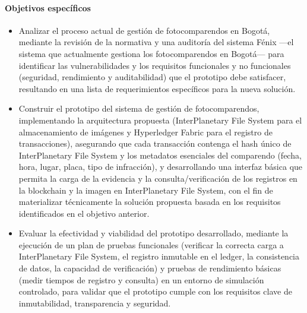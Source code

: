 \paragraph{Objetivos específicos}
\begin{itemize}
    \item Analizar el proceso actual de gestión de fotocomparendos en Bogotá, mediante la revisión de la normativa y una auditoría del sistema Fénix —el sistema que actualmente gestiona los fotocomparendos en Bogotá— para identificar las vulnerabilidades y los requisitos funcionales y no funcionales (seguridad, rendimiento y auditabilidad) que el prototipo debe satisfacer, resultando en una lista de requerimientos específicos para la nueva solución.
    \item Construir el prototipo del sistema de gestión de fotocomparendos, implementando la arquitectura propuesta (InterPlanetary File System para el almacenamiento de imágenes y Hyperledger Fabric para el registro de transacciones), asegurando que cada transacción contenga el hash único de InterPlanetary File System y los metadatos esenciales del comparendo (fecha, hora, lugar, placa, tipo de infracción), y desarrollando una interfaz básica que permita la carga de la evidencia y la consulta/verificación de los registros en la blockchain y la imagen en InterPlanetary File System, con el fin de materializar técnicamente la solución propuesta basada en los requisitos identificados en el objetivo anterior.
    \item Evaluar la efectividad y viabilidad del prototipo desarrollado, mediante la ejecución de un plan de pruebas funcionales (verificar la correcta carga a InterPlanetary File System, el registro inmutable en el ledger, la consistencia de datos, la capacidad de verificación) y pruebas de rendimiento básicas (medir tiempos de registro y consulta) en un entorno de simulación controlado, para validar que el prototipo cumple con los requisitos clave de inmutabilidad, transparencia y seguridad.
\end{itemize} 